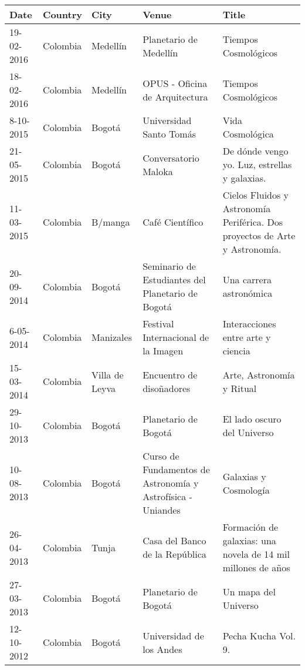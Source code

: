 \documentclass[letterpaper,11pt,onecolumn]{article}
\begin{document}
\begin{tabular}{p{2.0cm} p{1.5cm} p{1.5cm} p{4.5cm} p{6.0cm}}\hline
Date & Country & City& Venue& Title\\\hline
19-02-2016 & Colombia & Medell\'in & Planetario de Medell\'in & Tiempos Cosmol\'ogicos\\
18-02-2016 & Colombia & Medell\'in & OPUS - Oficina de Arquitectura & Tiempos Cosmol\'ogicos\\
8-10-2015  & Colombia & Bogot\'a & Universidad Santo Tom\'as & Vida Cosmol\'ogica \\
21-05-2015 & Colombia & Bogot\'a & Conversatorio Maloka & De d\'onde vengo yo. Luz, estrellas y galaxias.\\
11-03-2015 & Colombia & B/manga & Caf\'e Cient\'ifico & Cielos Fluidos y Astronom\'ia Perif\'erica. Dos proyectos de Arte y Astronom\'ia.\\
20-09-2014 & Colombia & Bogot\'a & Seminario de Estudiantes del Planetario de Bogot\'a& Una carrera astron\'omica \\
6-05-2014 & Colombia & Manizales & Festival Internacional de la Imagen & Interacciones entre arte y ciencia\\
15-03-2014  & Colombia & Villa de Leyva & Encuentro de diso\~nadores & Arte, Astronomía y Ritual \\
29-10-2013 & Colombia & Bogot\'a & Planetario de Bogot\'a & El lado oscuro del Universo\\
10-08-2013 & Colombia & Bogot\'a & Curso de Fundamentos de Astronom\'ia y Astrof\'isica - Uniandes &
Galaxias y Cosmolog\'ia\\
26-04-2013 & Colombia & Tunja & Casa del Banco de la Rep\'ublica &
Formaci\'on de galaxias: una novela de 14 mil millones de a\~nos\\  
27-03-2013 & Colombia & Bogot\'a & Planetario de Bogot\'a & Un mapa del
Universo\\
12-10-2012 & Colombia & Bogot\'a & Universidad de los Andes & Pecha
Kucha Vol. 9.
\end{tabular}
\end{document}
